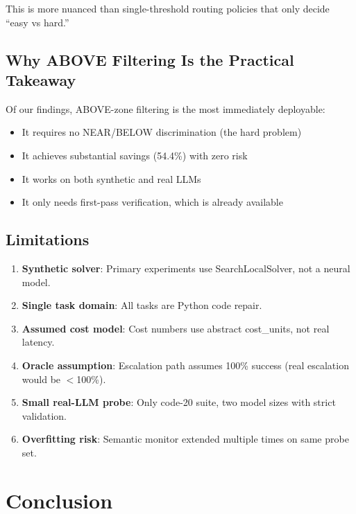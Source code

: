 \documentclass[11pt,a4paper]{article}
\begin{document}
This is more nuanced than single-threshold routing policies that only decide ``easy vs hard.''

\subsection{Why ABOVE Filtering Is the Practical Takeaway}

Of our findings, ABOVE-zone filtering is the most immediately deployable:
\begin{itemize}
    \item It requires no NEAR/BELOW discrimination (the hard problem)
    \item It achieves substantial savings (54.4\%) with zero risk
    \item It works on both synthetic and real LLMs
    \item It only needs first-pass verification, which is already available
\end{itemize}

\subsection{Limitations}

\begin{enumerate}
    \item \textbf{Synthetic solver}: Primary experiments use SearchLocalSolver, not a neural model.
    \item \textbf{Single task domain}: All tasks are Python code repair.
    \item \textbf{Assumed cost model}: Cost numbers use abstract cost\_units, not real latency.
    \item \textbf{Oracle assumption}: Escalation path assumes 100\% success (real escalation would be $<$100\%).
    \item \textbf{Small real-LLM probe}: Only code-20 suite, two model sizes with strict validation.
    \item \textbf{Overfitting risk}: Semantic monitor extended multiple times on same probe set.
\end{enumerate}

\section{Conclusion}
\end{document}
